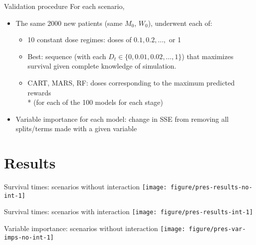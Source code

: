 \documentclass[handout]{beamer}
\begin{document}
\begin{frame}[c]{Validation procedure}
  For each scenario,
  \begin{itemize}[<+(1)->]
    \item The same 2000 new patients (same $M_{0}$, $W_{0}$), underwent each of:
  \begin{itemize}[<+(1)->]
    \item 10 constant dose regimes: doses of $0.1, 0.2, \ldots,$ or 1
        \item Best: sequence (with each $D_{t} \in \{0, 0.01, 0.02, \ldots, 1\}$) that maximizes survival given complete knowledge of simulation.
    \item CART, MARS, RF: doses corresponding to the maximum predicted rewards \\* (for each of the 100 models for each stage)
  \end{itemize}
  \item Variable importance for each model: change in SSE from removing all splits/terms made with a given variable 
  \end{itemize}
\end{frame}

\section{Results} %
\label{sec:results}


\begin{frame}[c]{Survival times: scenarios without interaction}
\centering
  \texttt{[image: figure/pres-results-no-int-1]} 
\end{frame}

\begin{frame}[c]{Survival times: scenarios with interaction}
  \centering
  \texttt{[image: figure/pres-results-int-1]} 
\end{frame}

\begin{frame}[c]{Variable importance: scenarios without interaction}
\centering
  \texttt{[image: figure/pres-var-imps-no-int-1]} 
\end{frame}
\end{document}
